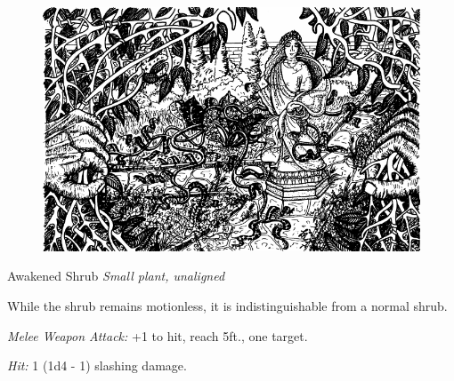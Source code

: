 \documentclass[palace_of_the_silver_princess]{subfiles}
\begin{document}
\begin{figure}[!ht]
    \includegraphics[width=\textwidth]{img/garden.png}
\end{figure}


\begin{monsterbox}{Awakened Shrub}
	\textit{Small plant, unaligned}\\
	\hline
	\basics[
		armorclass = {9},
		hitpoints = {10 (3d6)},
		speed = {20~ft.}]
	\hline
	\stats[
		STR = \stat{3},
		DEX = \stat{8},
		CON = \stat{11},
		INT = \stat{10},
		WIS = \stat{10},
		CHA = \stat{6}]
	\hline
	\details[
        damagevulnerabilities = {fire},
        damageresistances = {piercing},
		senses = {passive Perception 10},
		languages = {Common},
		challenge = {0 (10 XP)}]
	\hline
	\begin{monsteraction}
        While the shrub remains motionless, it is indistinguishable
        from a normal shrub.
	\end{monsteraction}

    \begin{monsteraction}[Rake]
		\textit{Melee Weapon Attack:} +1 to hit, reach 5ft., one target.

        \textit{Hit:} 1 (1d4 -  1) slashing damage.
	\end{monsteraction}
\end{monsterbox}
\end{document}
